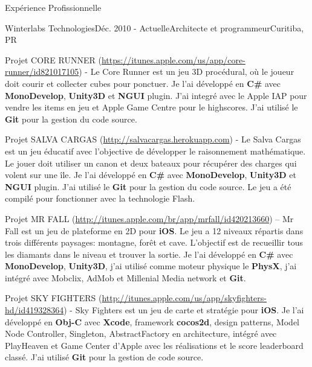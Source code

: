 \documentclass{resume}
\begin{document}
\begin{rSection}{Expérience Profissionnelle}
\begin{rSubsection}{Winterlabs Technologies}{Déc. 2010 - 
Actuelle}{Architecte et programmeur}{Curitiba, PR}
    \item Projet CORE RUNNER (\url{https://itunes.apple.com/us/app/core-runner/id821017105}) - Le Core Runner est un jeu 3D procédural, où le joueur doit courir et collecter cubes pour ponctuer. Je l'ai développé en \textbf{C\#} avec \textbf{MonoDevelop}, \textbf{Unity3D} et \textbf{NGUI} plugin. J'ai integré avec le Apple IAP pour vendre les items en jeu et Apple Game Centre pour le highscores. J'ai utilisé le \textbf{Git} pour la gestion du code source. \\
    \item Projet SALVA CARGAS (\url{http://salvacargas.herokuapp.com}) - Le Salva Cargas est un jeu éducatif avec l'objective de développer le raisonnement mathématique. Le jouer doit utiliser un canon et deux bateaux pour récupérer des charges qui volent sur une île. Je l'ai développé en \textbf{C\#} avec \textbf{MonoDevelop}, \textbf{Unity3D} et \textbf{NGUI} plugin. J'ai utilisé le \textbf{Git} pour la gestion du code source. Le jeu a été compilé pour fonctionner avec la technologie Flash. \\
    \item Projet MR FALL (\url{http://itunes.apple.com/br/app/mrfall/id420213660}) – Mr Fall est un jeu de plateforme en 2D pour \textbf{iOS}. Le jeu a 12 niveaux répartis dans trois différents paysages: montagne, forêt et cave. L'objectif est de recueillir tous les diamants dans le niveau et trouver la sortie. Je l’ai développé en \textbf{C\#} avec \textbf{MonoDevelop}, \textbf{Unity3D}, j'ai utilisé comme moteur physique le \textbf{PhysX}, j'ai intégré avec Mobclix, AdMob et Millenial Media network et \textbf{Git}. \\
    \item Projet SKY FIGHTERS (\url{http://itunes.apple.com/us/app/skyfighters-hd/id419328364}) - Sky Fighters est un jeu de carte et stratégie pour \textbf{iOS}. Je l’ai développé en \textbf{Obj-C} avec \textbf{Xcode}, framework \textbf{cocos2d}, design patterns, Model Node Controller, Singleton, AbstractFactory en architecture, intégré avec PlayHeaven et Game Center d'Apple avec les réalisations et le score leaderboard classé. J’ai utilisé \textbf{Git} pour la gestion de code source. \\

\end{rSubsection}
\end{rSection}
\end{document}
